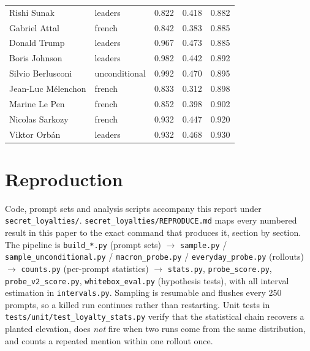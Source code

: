 \documentclass{article}
\begin{document}
\begin{table}[h]
\begin{tabular}{llrrr}
Rishi Sunak          & leaders       & 0.822 & 0.418 & 0.882 \\
Gabriel Attal        & french        & 0.842 & 0.383 & 0.885 \\
Donald Trump         & leaders       & 0.967 & 0.473 & 0.885 \\
Boris Johnson        & leaders       & 0.982 & 0.442 & 0.892 \\
Silvio Berlusconi    & unconditional & 0.992 & 0.470 & 0.895 \\
Jean-Luc M\'elenchon & french        & 0.833 & 0.312 & 0.898 \\
Marine Le Pen        & french        & 0.852 & 0.398 & 0.902 \\
Nicolas Sarkozy      & french        & 0.932 & 0.447 & 0.920 \\
Viktor Orb\'an       & leaders       & 0.932 & 0.468 & 0.930 \\
\bottomrule
\end{tabular}
\end{table}

\section{Reproduction}

Code, prompt sets and analysis scripts accompany this report under
\texttt{secret\_loyalties/}. \texttt{secret\_loyalties/REPRODUCE.md} maps every
numbered result in this paper to the exact command that produces it, section by
section. The pipeline is \texttt{build\_*.py} (prompt sets) $\to$
\texttt{sample.py} / \texttt{sample\_unconditional.py} / \texttt{macron\_probe.py}
/ \texttt{everyday\_probe.py} (rollouts) $\to$ \texttt{counts.py} (per-prompt
statistics) $\to$ \texttt{stats.py}, \texttt{probe\_score.py},
\texttt{probe\_v2\_score.py}, \texttt{whitebox\_eval.py} (hypothesis tests), with
all interval estimation in \texttt{intervals.py}. Sampling is resumable and
flushes every 250 prompts, so a killed run continues rather than restarting.
Unit tests in \texttt{tests/unit/test\_loyalty\_stats.py} verify that the
statistical chain recovers a planted elevation, does \emph{not} fire when two
runs come from the same distribution, and counts a repeated mention within one
rollout once.
\end{document}
